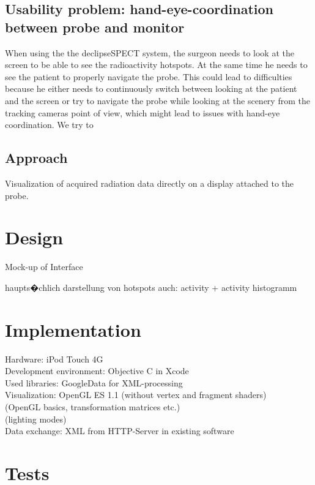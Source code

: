 \documentclass{scrartcl}
\begin{document}
\subsection{Usability problem: hand-eye-coordination between probe and monitor}


When using the the declipseSPECT system, the surgeon needs to look at the screen to be able to see the radioactivity hotspots. At the same time he needs to see the patient to properly navigate the probe. This could lead to difficulties because he either needs to continuously switch between looking at the patient and the screen or try to navigate the probe while looking at the scenery from the tracking cameras point of view, which might lead to issues with hand-eye coordination.
We try to 

\subsection{Approach}
Visualization of acquired radiation data directly on a display attached to the probe.

\section{Design}

Mock-up of Interface

haupts�chlich darstellung von hotspots
auch: activity + activity histogramm

\section{Implementation}

Hardware: iPod Touch 4G\\
Development environment: Objective C in Xcode\\
Used libraries: GoogleData for XML-processing\\
Visualization: OpenGL ES 1.1 (without vertex and fragment shaders)\\
(OpenGL basics, transformation matrices etc.)\\
(lighting modes)\\
Data exchange: XML from HTTP-Server in existing software\\

\section{Tests}
\end{document}
